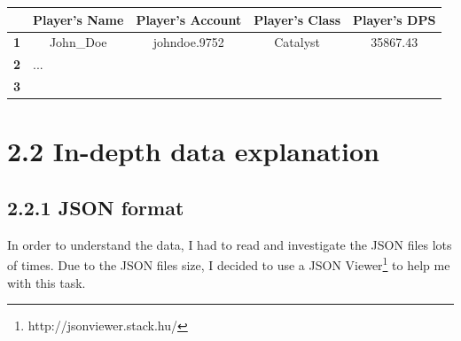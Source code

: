 \documentclass[12pt,a4paper]{article}
\begin{document}
    \begin{table}[!h]
        \begin{tabular}{|c|llll}
        \hline
                                           & \multicolumn{1}{c|}{\cellcolor[HTML]{CBCEFB}Player's Name} & \multicolumn{1}{c|}{\cellcolor[HTML]{CBCEFB}Player's Account} & \multicolumn{1}{c|}{\cellcolor[HTML]{CBCEFB}Player's Class} & \multicolumn{1}{c|}{\cellcolor[HTML]{CBCEFB}Player's DPS} \\ \hline
        \cellcolor[HTML]{FFCCC9}\textbf{1} & \multicolumn{1}{c}{John\_Doe}                              & \multicolumn{1}{c}{johndoe.9752}                              & \multicolumn{1}{c}{Catalyst}                                & \multicolumn{1}{c}{35867.43}                              \\ \cline{1-1}
        \cellcolor[HTML]{FFCCC9}\textbf{2} & ...                                                        &                                                               &                                                             &                                                           \\ \cline{1-1}
        \cellcolor[HTML]{FFCCC9}\textbf{3} &                                                            &                                                               &                                                             &                                                           \\ \cline{1-1}
        \end{tabular}
    \end{table}

    \newpage

    \section*{\large 2.2 In-depth data explanation}

    \subsection*{\normalsize 2.2.1 JSON format}
    In order to understand the data, I had to read and investigate the JSON files lots of times.
    Due to the JSON files size, I decided to use a JSON Viewer\footnote{http://jsonviewer.stack.hu/} 
    to help me with this task.\\
\end{document}
